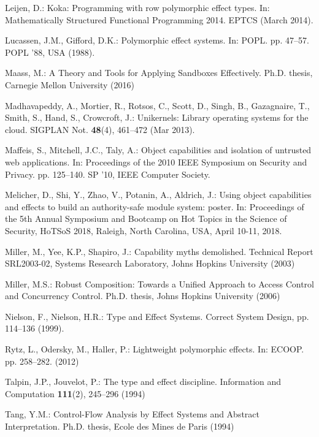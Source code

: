 \documentclass[runningheads]{llncs}
\begin{document}
\begin{thebibliography}{10}
Leijen, D.: Koka: Programming with row polymorphic effect types. In:
  Mathematically Structured Functional Programming 2014. EPTCS (March 2014).

Lucassen, J.M., Gifford, D.K.: Polymorphic effect systems. In: POPL.
  pp. 47--57. POPL '88, USA (1988).

Maass, M.: {A Theory and Tools for Applying Sandboxes Effectively}. Ph.D.
  thesis, Carnegie Mellon University (2016)

Madhavapeddy, A., Mortier, R., Rotsos, C., Scott, D., Singh, B., Gazagnaire,
  T., Smith, S., Hand, S., Crowcroft, J.: Unikernels: Library operating systems
  for the cloud. SIGPLAN Not.  \textbf{48}(4),  461--472 (Mar 2013).

Maffeis, S., Mitchell, J.C., Taly, A.: Object capabilities and isolation of
  untrusted web applications. In: Proceedings of the 2010 IEEE Symposium on
  Security and Privacy. pp. 125--140. SP '10, IEEE Computer Society.

Melicher, D., Shi, Y., Zhao, V., Potanin, A., Aldrich, J.: Using object capabilities and
effects to build an authority-safe module system: poster. In: Proceedings of the
5th Annual Symposium and Bootcamp on Hot Topics in the Science of Security,
HoTSoS 2018, Raleigh, North Carolina, USA, April 10-11, 2018.

Miller, M., Yee, K.P., Shapiro, J.: Capability myths demolished.
 Technical Report SRL2003-02, Systems Research Laboratory, Johns Hopkins University (2003)

Miller, M.S.: Robust Composition: Towards a Unified Approach to Access Control
  and Concurrency Control. Ph.D. thesis, Johns Hopkins University (2006)

Nielson, F., Nielson, H.R.: {Type and Effect Systems}. Correct System Design, pp. 114--136 (1999).

Rytz, L., Odersky, M., Haller, P.: Lightweight polymorphic effects. In: ECOOP.
  pp. 258--282. (2012)

Talpin, J.P., Jouvelot, P.: The type and effect discipline. Information and
  Computation  \textbf{111}(2),  245--296 (1994)

Tang, Y.M.: Control-Flow Analysis by Effect Systems and Abstract
  Interpretation. Ph.D. thesis, Ecole des Mines de Paris (1994)

\end{thebibliography}
\end{document}
